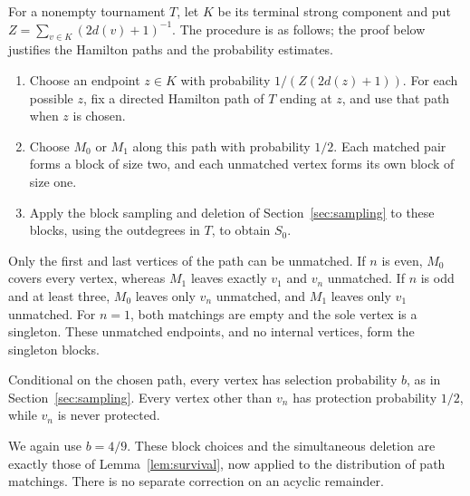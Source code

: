 \documentclass[10pt,a4paper]{article}
\begin{document}
For a nonempty tournament \(T\), let \(K\) be its terminal strong component and put \(Z=\sum_{v\in K}(2d(v)+1)^{-1}\). The procedure is as follows; the proof below justifies the Hamilton paths and the probability estimates.
\begin{enumerate}
\item Choose an endpoint \(z\in K\) with probability \(1/(Z(2d(z)+1))\). For each possible \(z\), fix a directed Hamilton path of \(T\) ending at \(z\), and use that path when \(z\) is chosen.
\item Choose \(M_0\) or \(M_1\) along this path with probability \(1/2\). Each matched pair forms a block of size two, and each unmatched vertex forms its own block of size one.
\item Apply the block sampling and deletion of Section~\ref{sec:sampling} to these blocks, using the outdegrees in $T$, to obtain $S_0$.
\end{enumerate}
Only the first and last vertices of the path can be unmatched. If \(n\) is even, \(M_0\) covers every vertex, whereas \(M_1\) leaves exactly \(v_1\) and \(v_n\) unmatched. If \(n\) is odd and at least three, \(M_0\) leaves only \(v_n\) unmatched, and \(M_1\) leaves only \(v_1\) unmatched. For \(n=1\), both matchings are empty and the sole vertex is a singleton. These unmatched endpoints, and no internal vertices, form the singleton blocks.

Conditional on the chosen path, every vertex has selection probability $b$, as in Section~\ref{sec:sampling}. Every vertex other than $v_n$ has protection probability $1/2$, while $v_n$ is never protected.

We again use \(b=4/9\). These block choices and the simultaneous deletion are exactly those of Lemma~\ref{lem:survival}, now applied to the distribution of path matchings. There is no separate correction on an acyclic remainder.
\end{document}

